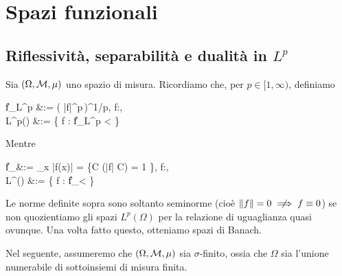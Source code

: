 \chapter{Spazi funzionali}
\section{Riflessività, separabilità e dualità in $L^p$}
Sia $(\Omega, \mathcal{M}, \mu)$ uno spazio di misura. Ricordiamo che, per $p \in [1,\infty)$, definiamo
\begin{eqalign*}
	\|f\|_{L^p} &:= \left( \int |f|^p\,\de\mu \right)^{1/p}\!\!, \qquad f:\Omega \to \R,\\
	L^p(\Omega) &:= \{ f : \Omega \to \R \suchthat \|f\|_{L^p} < \infty \}
\end{eqalign*}
Mentre
\begin{eqalign*}
	\|f\|_\infty &:= \esssup_{x \in \Omega} |f(x)| = \inf \{C \in \R \suchthat \mu(|f| \leq C) = 1 \}, \qquad f:\Omega \to \R,\\
	L^\infty(\Omega) &:= \{ f : \Omega \to \R \suchthat \|f\|_\infty < \infty \}
\end{eqalign*}

Le norme definite sopra sono soltanto seminorme (cioè $\|f\| = 0 \nimplies f \equiv 0$) se non quozientiamo gli spazi $L^p(\Omega)$ per la relazione di uguaglianza quasi ovunque. Una volta fatto questo, otteniamo spazi di Banach.

Nel seguente, assumeremo che $(\Omega, \mathcal{M}, \mu)$ sia $\sigma$-finito, ossia che $\Omega$ sia l'unione numerabile di sottoinsiemi di misura finita.

